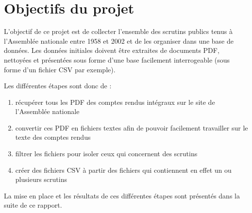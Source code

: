 \section{Objectifs du projet}

L'objectif de ce projet est de collecter l'ensemble des scrutins publics tenus à l'Assemblée nationale entre 1958 et 2002 et de les organiser dans une base de données.
Les données initiales doivent être extraites de documents PDF, nettoyées et présentées sous forme d'une base facilement interrogeable (sous forme d'un fichier CSV par exemple).

Les différentes étapes sont donc de :
\begin{enumerate}
\item récupérer tous les PDF des comptes rendus intégraux sur le site de l'Assemblée nationale
\item convertir ces PDF en fichiers textes afin de pouvoir facilement travailler sur le texte des comptes rendus
\item filtrer les fichiers pour isoler ceux qui concernent des scrutins
\item créer des fichiers CSV à partir des fichiers qui contiennent en effet un ou plusieurs scrutins
\end{enumerate}

La mise en place et les résultats de ces différentes étapes sont présentés dans la suite de ce rapport.

